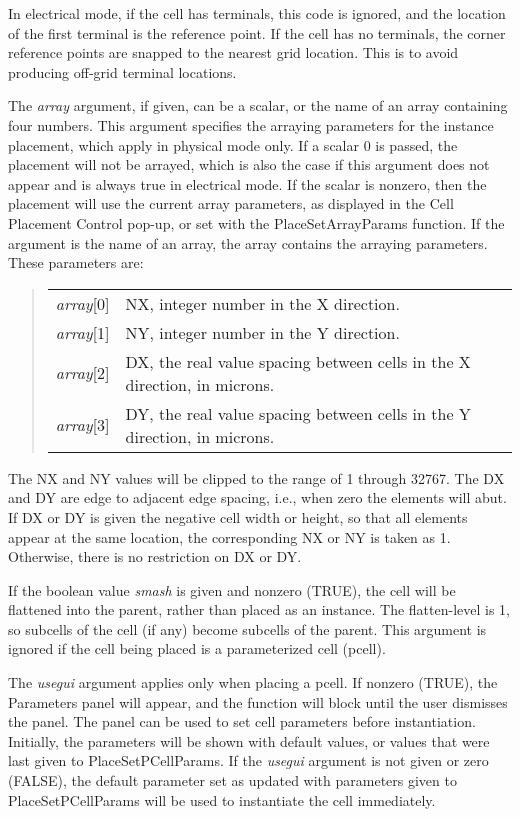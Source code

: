 \begin{description}
In electrical mode, if the cell has terminals, this code is ignored,
and the location of the first terminal is the reference point.  If the
cell has no terminals, the corner reference points are snapped to the
nearest grid location.  This is to avoid producing off-grid terminal
locations.

The {\it array} argument, if given, can be a scalar, or the name of an
array containing four numbers.  This argument specifies the arraying
parameters for the instance placement, which apply in physical mode
only.  If a scalar 0 is passed, the placement will not be arrayed,
which is also the case if this argument does not appear and is always
true in electrical mode.  If the scalar is nonzero, then the placement
will use the current array parameters, as displayed in the {\cb Cell
Placement Control} pop-up, or set with the {\vt PlaceSetArrayParams}
function.  If the argument is the name of an array, the array contains
the arraying parameters.  These parameters are:

\begin{quote}
\begin{tabular}{ll}
{\it array\/}[0] & NX, integer number in the X direction.\\
{\it array\/}[1] & NY, integer number in the Y direction.\\
{\it array\/}[2] & DX, the real value spacing between cells in
  the X direction, in microns.\\
{\it array\/}[3] & DY, the real value spacing between cells in
  the Y direction, in microns.\\
\end{tabular}
\end{quote}

The NX and NY values will be clipped to the range of 1 through 32767. 
The DX and DY are edge to adjacent edge spacing, i.e., when zero the
elements will abut.  If DX or DY is given the negative cell width or
height, so that all elements appear at the same location, the
corresponding NX or NY is taken as 1.  Otherwise, there is no
restriction on DX or DY.

If the boolean value {\it smash} is given and nonzero (TRUE), the cell
will be flattened into the parent, rather than placed as an instance. 
The flatten-level is 1, so subcells of the cell (if any) become
subcells of the parent.  This argument is ignored if the cell being
placed is a parameterized cell (pcell).

The {\it usegui} argument applies only when placing a pcell.  If
nonzero (TRUE), the {\cb Parameters} panel will appear, and the
function will block until the user dismisses the panel.  The panel can
be used to set cell parameters before instantiation.  Initially, the
parameters will be shown with default values, or values that were last
given to {\vt PlaceSetPCellParams}.  If the {\it usegui} argument is
not given or zero (FALSE), the default parameter set as updated with
parameters given to {\vt PlaceSetPCellParams} will be used to
instantiate the cell immediately.


\end{description}
